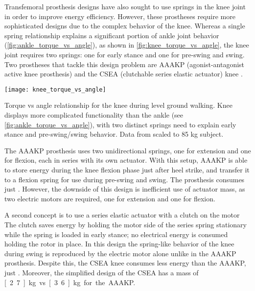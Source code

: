 Transfemoral prosthesis designs have also sought to use springs in the knee
joint in order to improve energy efficiency. However, these prostheses require
more sophisticated designs due to the complex behavior of the knee. Whereas a
single spring relationship explains a significant portion of ankle joint
behavior (\cref{fig:ankle_torque_vs_angle}), as shown in
\cref{fig:knee_torque_vs_angle}, the knee joint requires two springs: one for
early stance and one for pre-swing and swing. Two prostheses that tackle this
design problem are AAAKP (agonist-antagonist active knee prosthesis)
\citep{martinez2008design, martinez2011antagonistic} and the CSEA (clutchable
series elastic actuator) knee \citep{rouse2014clutchable, rouse2015design}.

\begin{marginfigure}
    \centering
    \texttt{[image: knee\_torque\_vs\_angle]}
    \caption{Torque vs angle relationship for the knee during level ground
    walking. Knee displays more complicated functionality than the ankle (see
    \cref{fig:ankle_torque_vs_angle}), with two distinct springs need to explain
    early stance and pre-swing/swing behavior. Data from
    \citet{winter2009biomechanics} scaled to 85 kg subject.}
    \label{fig:knee_torque_vs_angle}
\end{marginfigure}

The AAAKP prosthesis uses two unidirectional springs, one for extension and one
for flexion, each in series with its own actuator. With this setup,
AAAKP is able to store energy during the knee flexion phase just after heel
strike, and transfer it to a flexion spring for use during pre-swing and swing.
The prosthesis consumes just . However, the downside of
this design is inefficient use of actuator mass, as two electric motors are
required, one for extension and one for flexion.

A second concept is to use a series elastic actuator with a clutch on the motor
\citep{rouse2014clutchable, rouse2015design} The clutch saves energy by holding
the motor side of the series spring stationary while the spring is loaded in
early stance; no electrical energy is consumed holding the rotor in place. In
this design the spring-like behavior of the knee during swing is reproduced by
the electric motor alone unlike in the AAAKP prosthesis. Despite this, the
CSEA knee consumes less energy than the AAAKP, just .
Moreover, the simplified design of the CSEA has a mass of \unit[2.7]{kg} vs
\unit[3.6]{kg} for the AAAKP.

